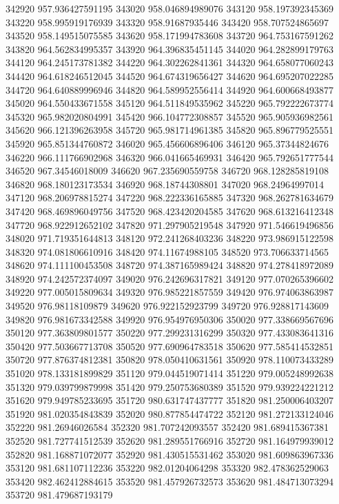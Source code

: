 {342920 957.936427591195
343020 958.046894989076
343120 958.197392345369
343220 958.995919176939
343320 958.91687935446
343420 958.707524865697
343520 958.149515075585
343620 958.171994783608
343720 964.753167591262
343820 964.562834995357
343920 964.396835451145
344020 964.282899179763
344120 964.245173781382
344220 964.302262841361
344320 964.658077060243
344420 964.618246512045
344520 964.674319656427
344620 964.695207022285
344720 964.640889996946
344820 964.589952556414
344920 964.600668493877
345020 964.550433671558
345120 964.511849535962
345220 965.792222673774
345320 965.982020804991
345420 966.104772308857
345520 965.905936982561
345620 966.121396263958
345720 965.981714961385
345820 965.896779525551
345920 965.851344760872
346020 965.456606896406
346120 965.37344824676
346220 966.111766902968
346320 966.041665469931
346420 965.792651777544
346520 967.34546018009
346620 967.235690559758
346720 968.128285819108
346820 968.180123173534
346920 968.18744308801
347020 968.24964997014
347120 968.206978815274
347220 968.222336165885
347320 968.262781634679
347420 968.469896049756
347520 968.423420204585
347620 968.613216412348
347720 968.922912652102
347820 971.297905219548
347920 971.546619496856
348020 971.719351644813
348120 972.241268403236
348220 973.986915122598
348320 974.081806610916
348420 974.11674988105
348520 973.706633714565
348620 974.111100453508
348720 974.387165989424
348820 974.278418972089
348920 974.242572374097
349020 976.242696317821
349120 977.070265396602
349220 977.005015809634
349320 976.985221857559
349420 976.974063863987
349520 976.98118109879
349620 976.922152923799
349720 976.928817143609
349820 976.981673342588
349920 976.954976950306
350020 977.338669567696
350120 977.363809801577
350220 977.299231316299
350320 977.433083641316
350420 977.503667713708
350520 977.690964783518
350620 977.585414532851
350720 977.876374812381
350820 978.050410631561
350920 978.110073433289
351020 978.133181899829
351120 979.044519071414
351220 979.005248992638
351320 979.039799879998
351420 979.250753680389
351520 979.939224221212
351620 979.949785233695
351720 980.631747437777
351820 981.250006403207
351920 981.020354843839
352020 980.877854474722
352120 981.272133124046
352220 981.26946026584
352320 981.707242093557
352420 981.689415367381
352520 981.727741512539
352620 981.289551766916
352720 981.164979939012
352820 981.168871072077
352920 981.430515531462
353020 981.609863967336
353120 981.681107112236
353220 982.01204064298
353320 982.478362529063
353420 982.462412884615
353520 981.457926732573
353620 981.484713073294
353720 981.479687193179
}
